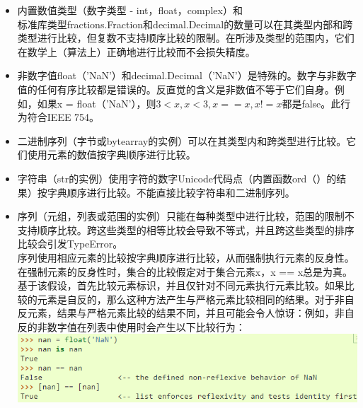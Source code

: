 \documentclass[10pt,UTF8]{ctexart}
\begin{document}
\begin{itemize}
\item 内置数值类型（数字类型 - int，float，complex）和\\标准库类型fractions.Fraction和decimal.Decimal的数量可以在其类型内部和跨类型进行比较，但复数不支持顺序比较的限制。在所涉及类型的范围内，它们在数学上（算法上）正确地进行比较而不会损失精度。
\item 非数字值float（'NaN'）和decimal.Decimal（'NaN'）是特殊的。数字与非数字值的任何有序比较都是错误的。反直觉的含义是非数值不等于它们自身。例如，如果x = float（'NaN'），则$3 <x, x <3, x == x, x != x$都是false。此行为符合IEEE 754。
\item 二进制序列（字节或bytearray的实例）可以在其类型内和跨类型进行比较。它们使用元素的数值按字典顺​​序进行比较。
\item 字符串（str的实例）使用字符的数字Unicode代码点（内置函数ord（）的结果）按字典顺序进行比较。不能直接比较字符串和二进制序列。
\item 序列（元组，列表或范围的实例）只能在每种类型中进行比较，范围的限制不支持顺序比较。跨这些类型的相等比较会导致不等式，并且跨这些类型的排序比较会引发TypeError。\\
\indent 序列使用相应元素的比较按字典顺序进行比较，从而强制执行元素的反身性。\\
\indent 在强制元素的反身性时，集合的比较假定对于集合元素x，x == x总是为真。基于该假设，首先比较元素标识，并且仅针对不同元素执行元素比较。如果比较的元素是自反的，那么这种方法产生与严格元素比较相同的结果。对于非自反元素，结果与严格元素比较的结果不同，并且可能会令人惊讶：例如，非自反的非数字值在列表中使用时会产生以下比较行为：\\
\includegraphics[scale=0.65]{compasions2.jpg} 
\end{itemize}
\end{document}
